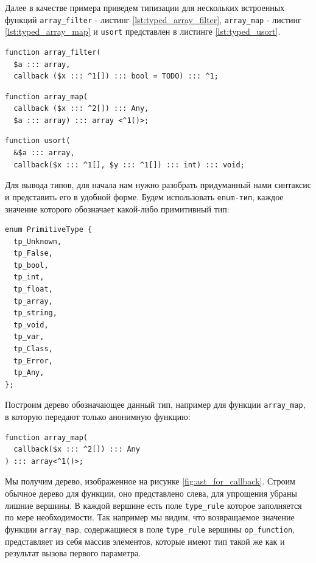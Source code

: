 Далее в качестве примера приведем типизации для нескольких встроенных функций \verb|array_filter| - листинг \ref{lst:typed_array_filter}, \verb|array_map| - листинг \ref{lst:typed_array_map} и \verb|usort| представлен в листинге \ref{lst:typed_usort}.
\begin{lstlisting}[caption={Пример типизации функции array\_filter},label={lst:typed_array_filter}]
function array_filter(
  $a ::: array,
  callback ($x ::: ^1[]) ::: bool = TODO) ::: ^1;
\end{lstlisting}
\begin{lstlisting}[caption={Пример типизации функции array\_map},label={lst:typed_array_map}]
function array_map(
  callback ($x ::: ^2[]) ::: Any,
  $a ::: array) ::: array <^1()>;
\end{lstlisting}
\begin{lstlisting}[caption={Пример типизации функции usort},label={lst:typed_usort}]
function usort(
  &$a ::: array,
  callback($x ::: ^1[], $y ::: ^1[]) ::: int) ::: void;
\end{lstlisting}

Для вывода типов, для начала нам нужно разобрать придуманный нами синтаксис и представить его в удобной форме.
Будем использовать \verb|enum-тип|, каждое значение которого обозначает какой-либо примитивный тип:
\begin{lstlisting}
enum PrimitiveType {
  tp_Unknown,
  tp_False,
  tp_bool,
  tp_int,
  tp_float,
  tp_array,
  tp_string,
  tp_void,
  tp_var,
  tp_Class,
  tp_Error,
  tp_Any,
};
\end{lstlisting}

Построим дерево обозначающее данный тип, например для функции \verb|array_map|, в которую передают только анонимную функцию:
\begin{lstlisting}[label={lst:array_map_typed_ast}]
function array_map(
  callback($x ::: ^2[]) ::: Any
) ::: array<^1()>;
\end{lstlisting}
Мы получим дерево, изображенное на рисунке \ref{fig:ast_for_callback}.
Строим обычное дерево для функции, оно представлено слева, для упрощения убраны лишние вершины.
В каждой вершине есть поле \verb|type_rule| которое заполняется по мере необходимости.
Так например мы видим, что возвращаемое значение функции \verb|array_map|, содержащиеся в поле \verb|type_rule| вершины \verb|op_function|, представляет из себя массив элементов, которые имеют тип такой же как и результат вызова первого параметра.

